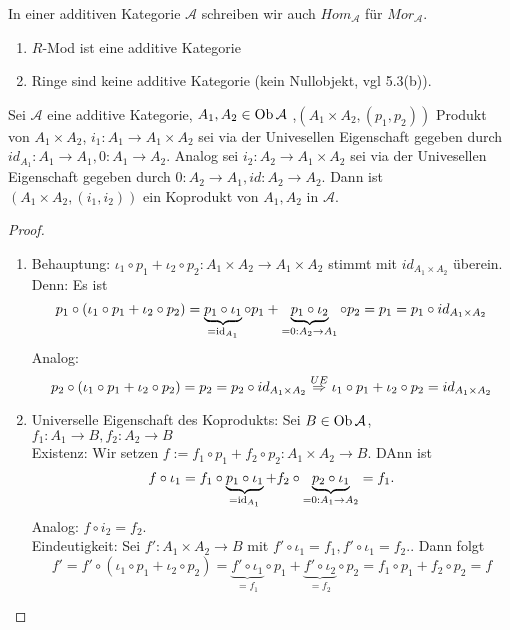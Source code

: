\begin{anm}
	In einer additiven Kategorie $\mathcal{A} $ schreiben wir auch $Hom_{\mathcal{A}}$ für $Mor_{\mathcal{A}}. $
\end{anm}
\begin{bsp}
	\begin{enumerate} [label=\alph*)]
		\item $R$-Mod ist eine additive Kategorie
		\item Ringe sind keine additive Kategorie (kein Nullobjekt, vgl 5.3(b)).
	\end{enumerate}
\end{bsp}
\begin{sa}\label{5.11}
	Sei $\mathcal{A} $ eine additive Kategorie, $ A_1,A_2 \in \text{Ob}\,\mathcal{A}$ ,$(A_1 \times A_2, (p_1,p_2)) $ Produkt von $ A_1 \times A_2 $, $ i_1: A_1 \to A_1 \times A_2 $ sei via der Univesellen Eigenschaft gegeben durch $id_{A_1}: A_1 \to A_1 , 0: A_1 \to A_2$. Analog sei $ i_2: A_2 \to A_1 \times A_2 $ sei via der Univesellen Eigenschaft gegeben durch $ 0: A_2 \to A_1, id: A_2 \to A_2$. Dann ist $(A_1 \times A_2, (i_1,i_2)) $ ein Koprodukt von $A_1,A_2$ in $\mathcal{A}$.
\end{sa}
\begin{proof}
	\begin{enumerate}
		\item Behauptung: $\iota_1 \circ p_1 + \iota_2 \circ p_2: A_1 \times A_2 \to A_1 \times A_2 $ stimmt mit $id_{A_1 \times A_2} $ überein. Denn: Es ist
		$$p_1 \circ (\iota_1 \circ p_1 + \iota_2 \circ p_2) = \underbrace{p_1 \circ \iota_1}_{=\operatorname{id}_{A_1}} \circ p_1+ \underbrace{p_1 \circ \iota_2}_{=0:A_2\to A_1} \circ p_2 = p_1 = p_1 \circ id_{A_1 \times A_2}$$ 
		Analog: $$p_2 \circ (\iota_1 \circ p_1 + \iota_2 \circ p_2) = p_2 = p_2 \circ id_{A_1 \times A_2} \overset{UE}{\Rightarrow} \iota_1 \circ p_1 + \iota_2 \circ p_2 = id_{A_1 \times A_2}$$
		\item Universelle Eigenschaft des Koprodukts:
		 Sei $ B \in \text{Ob}\,\mathcal{A} $, $ f_1: A_1 \to B, f_2: A_2 \to B $\\
		 Existenz: Wir setzen $f:= f_1 \circ p_1 + f_2 \circ p_2: A_1 \times A_2 \to B$. DAnn ist 
		 $$f \circ \iota_1 = f_1 \circ \underbrace{p_1 \circ \iota_1}_{=\operatorname{id}_{A_1}} + f_2 \circ \underbrace{p_2 \circ \iota_1}_{=0:A_1 \to A_2} = f_1.$$
		Analog: $f \circ i_2 = f_2.$\\
		Eindeutigkeit: Sei $f': A_1 \times A_2 \to B $ mit $f' \circ \iota_1 = f_1 , f' \circ \iota_1 = f_2.$. Dann folgt 
		$$f' = f' \circ (\iota_1 \circ p_1 + \iota_2 \circ p_2 ) = \underbrace{f' \circ \iota_1}_{=f_1}  \circ p_1 + \underbrace{f' \circ  \iota_2}_{=f_2} \circ p_2 = f_1 \circ p_1 + f_2 \circ p_2 = f $$
	\end{enumerate}
\end{proof}
